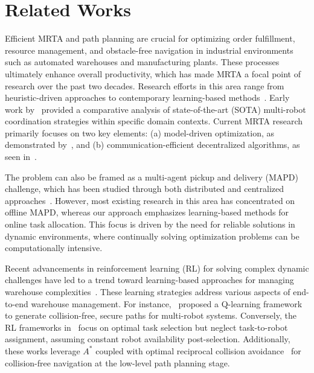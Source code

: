 \section{Related Works}
Efficient MRTA and path planning are crucial for optimizing order fulfillment, resource management, and obstacle-free navigation in industrial environments such as automated warehouses and manufacturing plants. These processes ultimately enhance overall productivity, which has made MRTA a focal point of research over the past two decades. Research efforts in this area range from heuristic-driven approaches to contemporary learning-based methods~\cite{khamis2015multi}. Early work by~\cite{gerkey2003multi} provided a comparative analysis of state-of-the-art (SOTA) multi-robot coordination strategies within specific domain contexts. Current MRTA research primarily focuses on two key elements: (a) model-driven optimization, as demonstrated by~\cite{wei2020particle}, and (b) communication-efficient decentralized algorithms, as seen in~\cite{chen2021decentralized, agrawal2022dc}.

The problem can also be framed as a multi-agent pickup and delivery (MAPD) challenge, which has been studied through both distributed and centralized approaches~\cite{ma2017lifelong, liu2019task, salzman2020research, xu2022multi}. However, most existing research in this area has concentrated on offline MAPD, whereas our approach emphasizes learning-based methods for online task allocation. This focus is driven by the need for reliable solutions in dynamic environments, where continually solving optimization problems can be computationally intensive.

Recent advancements in reinforcement learning (RL) for solving complex dynamic challenges have led to a trend toward learning-based approaches for managing warehouse complexities~\cite{yang2020multi, agrawal2022dc, agrawal2023rtaw}. These learning strategies address various aspects of end-to-end warehouse management. For instance,~\cite{yang2020multi} proposed a Q-learning framework to generate collision-free, secure paths for multi-robot systems. Conversely, the RL frameworks in~\cite{agrawal2022dc, agrawal2023rtaw} focus on optimal task selection but neglect task-to-robot assignment, assuming constant robot availability post-selection. Additionally, these works leverage $A^*$ coupled with optimal reciprocal collision avoidance~\cite{alonso2013optimal} for collision-free navigation at the low-level path planning stage.

